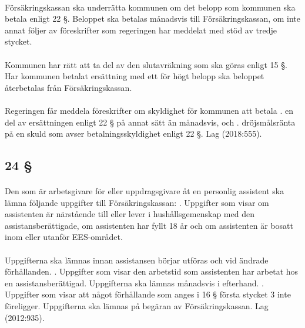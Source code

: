 \documentclass[a4paper,notitlepage,openany,10pt]{book}
\begin{document}
\paragraph*{}
Försäkringskassan ska underrätta kommunen om det belopp som kommunen ska betala enligt 22 §. Beloppet ska betalas månadsvis till Försäkringskassan, om inte annat följer av föreskrifter som regeringen har meddelat med stöd av tredje stycket.
\paragraph*{}
Kommunen har rätt att ta del av den slutavräkning som ska göras enligt 15 §. Har kommunen betalat ersättning med ett för högt belopp ska beloppet återbetalas från Försäkringskassan.
\paragraph*{}
Regeringen får meddela föreskrifter om skyldighet för kommunen att betala
. en del av ersättningen enligt 22 § på annat sätt än månadsvis, och
. dröjsmålsränta på en skuld som avser betalningsskyldighet enligt 22 §.
Lag (2018:555).
\subsection*{24 §}
\paragraph*{}
Den som är arbetsgivare för eller uppdragsgivare åt en personlig assistent ska lämna följande uppgifter till Försäkringskassan:
. Uppgifter som visar om assistenten är närstående till eller lever i hushållsgemenskap med den assistansberättigade, om assistenten har fyllt 18 år och om assistenten är bosatt inom eller utanför EES-området.
\paragraph*{}
Uppgifterna ska lämnas innan assistansen börjar utföras och vid ändrade förhållanden.
. Uppgifter som visar den arbetstid som assistenten har arbetat hos en assistansberättigad. Uppgifterna ska lämnas månadsvis i efterhand.
. Uppgifter som visar att något förhållande som anges i 16 § första stycket 3 inte föreligger. Uppgifterna ska lämnas på begäran av Försäkringskassan.
Lag (2012:935).
\end{document}
